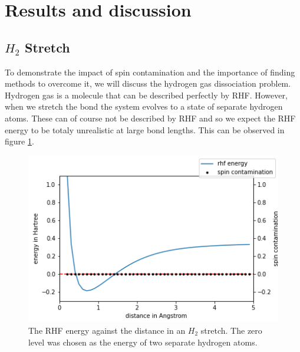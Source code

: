 \documentclass[twoside,twocolumn,9pt]{article}
\begin{document}
\section{Results and discussion}
\label{sec:results}

\subsection{$H_2$ Stretch}
\label{subsec:h2}
To demonstrate the impact of spin contamination and the importance of finding methods to overcome it, we will discuss the hydrogen gas dissociation problem\cite{Szabo1996}. Hydrogen
gas is a molecule that can be described perfectly by RHF. However, when we stretch the bond the system evolves to a state of separate hydrogen atoms. These can of course not be
described by RHF and so we expect the RHF energy to be totaly unrealistic at large bond lengths. This can be observed in figure \ref{fig:rhfstretch}.

\begin{center}
  \begin{figure}[h]
    \includegraphics[width=\linewidth]{./../notes/figures/rhf.png}
    \caption{The RHF energy against the distance in an $H_2$ stretch. The zero level was chosen as the energy of two separate hydrogen atoms.}
    \label{fig:rhfstretch}
  \end{figure}
\end{center}
\end{document}
